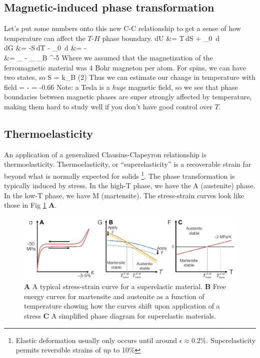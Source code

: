 \documentclass[12pt]{article}
\begin{document}
\subsection{Magnetic-induced phase transformation}
Let's put some numbers onto this new C-C relationship to get a sense of how temperature can affect the $T$-$H$ phase boundary.
\eqs
dU &= T\,dS + \mu_0  \,d\\
dG &= -S\,dT - \mu_0  \,d
\eqe
\eqs
{} &= -\\
\eqe
\eqs
\Delta {} &= _ - _  \mu_B  ^{-5} 
\eqe
Where we assumed that the magnetization of the ferromagnetic material was 4 Bohr magneton per atom.  For spins, we can have two states, so 
\eqs
\Delta S = k_B \ln(2)
\eqe
Thus we can estimate our change in temperature with field
\eqs
{} = - = -0.66 
\eqe
Note: a Tesla is a \emph{huge} magnetic field, so we see that phase boundaries between magnetic phases are super strongly affected by temperature, making them hard to study well if you don't have good control over $T$.

\subsection{Thermoelasticity}
An application of a generalized Clausius-Clapeyron relationship is thermoelasticity. Thermoelasticity, or ``superelasticity'' is a recoverable strain far beyond what is normally expected for solids \footnote{Elastic deformation usually only occurs until around $\epsilon \approx 0.2\%$. Superelasticity permits reversible strains of up to 10\%}.  The phase transformation is typically induced by stress.  In the high-T phase, we have the A (austenite) phase.  In the low-T phase, we have M (martensite).
The stress-strain curves look like those in Fig \ref{superElasticity} \textbf{A}.

\begin{figure}[h]
\centering
\includegraphics[width=\textwidth]{superelasticity}
\caption{\textbf{A} A typical stress-strain curve for a superelastic material. \textbf{B} Free energy curves for martensite and austenite as a function of temperature showing how the curves shift upon application of a stress \textbf{C} A simplified phase diagram for superelastic materials.}
\label{superElasticity}
\end{figure}
\end{document}
